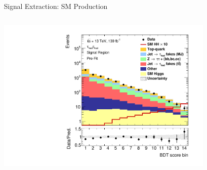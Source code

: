 \documentclass[11pt, xcolor={dvipsnames}, aspectratio=169]{beamer}
\begin{document}

\begin{frame}{Signal Extraction: SM \allbold{\HH} Production}
  \begin{columns}


    \centering
    \includegraphics[width=0.8\textwidth]{mva/prefit/Region_BMin0_incJet1_distSMBDT_J2_Y2015_DLLOS_T2_SpcTauHH_L0_Prefitlog}
  \end{columns}
\end{frame}

\end{document}
